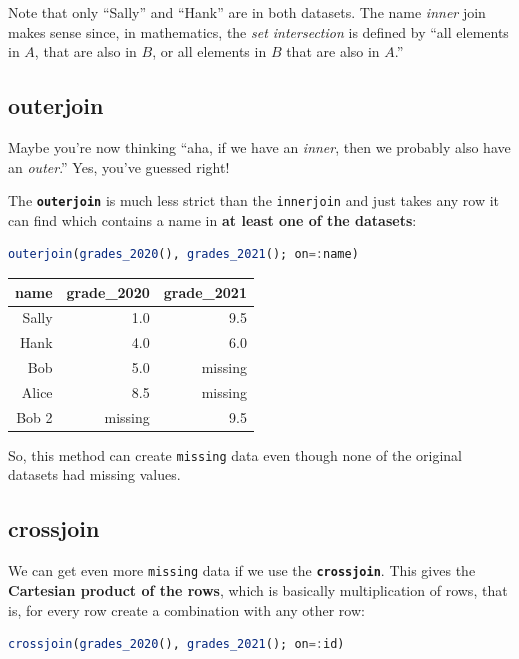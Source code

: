 \documentclass[
  notoc %
]{tufte-book}
\newcommand{\passthrough}[1]{#1}
\begin{document}
Note that only ``Sally'' and ``Hank'' are in both datasets. The name
\emph{inner} join makes sense since, in mathematics, the \emph{set
intersection} is defined by ``all elements in \(A\), that are also in
\(B\), or all elements in \(B\) that are also in \(A\).''

\hypertarget{sec:outerjoin}{%
\subsection{outerjoin}\label{sec:outerjoin}}

Maybe you're now thinking ``aha, if we have an \emph{inner}, then we
probably also have an \emph{outer}.'' Yes, you've guessed right!

The \textbf{\passthrough{\lstinline!outerjoin!}} is much less strict
than the \passthrough{\lstinline!innerjoin!} and just takes any row it
can find which contains a name in \textbf{at least one of the datasets}:

\begin{lstlisting}[language=Julia]
outerjoin(grades_2020(), grades_2021(); on=:name)
\end{lstlisting}

\begin{longtable}[]{@{}rrr@{}}
\toprule
name & grade\_2020 & grade\_2021 \\
\midrule
\endhead
Sally & 1.0 & 9.5 \\
Hank & 4.0 & 6.0 \\
Bob & 5.0 & missing \\
Alice & 8.5 & missing \\
Bob 2 & missing & 9.5 \\
\bottomrule
\end{longtable}

So, this method can create \passthrough{\lstinline!missing!} data even
though none of the original datasets had missing values.

\hypertarget{sec:crossjoin}{%
\subsection{crossjoin}\label{sec:crossjoin}}

We can get even more \passthrough{\lstinline!missing!} data if we use
the \textbf{\passthrough{\lstinline!crossjoin!}}. This gives the
\textbf{Cartesian product of the rows}, which is basically
multiplication of rows, that is, for every row create a combination with
any other row:

\begin{lstlisting}[language=Julia]
crossjoin(grades_2020(), grades_2021(); on=:id)
\end{lstlisting}
\end{document}
